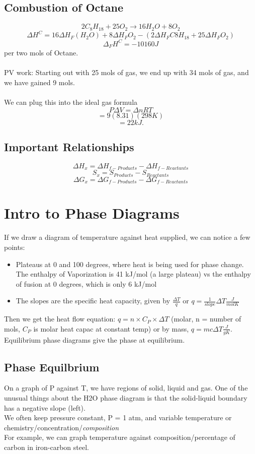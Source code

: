 \documentclass[10pt, twocolumn]{report}
\begin{document}
     \subsection{Combustion of Octane}
     $$2C_8H_{18} + 25O_2 \rightarrow 16H_2O + 8 O_2$$
     $$\Delta H^C = 16 \Delta H_F (H_2O) + 8 \Delta H_F O_2 - (2\Delta H_F C8H_{18} + 25\Delta H_F O_2)$$
     $$\Delta_F H^C = -10160 J $$ per two mols of Octane.\\\\ PV work: Starting out with 25 mols of gas, we end up with 34 mols of gas, and we have gained 9 mols. \\\\ We can plug this into the ideal gas formula $$P\Delta V = \Delta n R T$$ $$ = 9 (8.31)(298K)$$ $$=22 kJ. $$
     \subsection{Important Relationships}
	$$\Delta H_x = \Delta H_{f-Products} - \Delta H_{f-Reactants}$$
	$$ S_x = S_{Products} - S_{Reactants}$$
	$$\Delta G_x = \Delta G_{f - Products} - \Delta G_{f - Reactants}$$
    \section{Intro to Phase Diagrams}
    If we draw a diagram of temperature against heat supplied, we can notice a few points:
    \begin{itemize}
        \item Plateaus at 0 and 100 degrees, where heat is being used for phase change. The enthalpy of Vaporization is 41 kJ/mol (a large plateau) vs the enthalpy of fusion at 0 degrees, which is only 6 kJ/mol
        \item The slopes are the specific heat capacity, given by $\frac{\Delta T}{q}$ or $q = \frac{1}{slope}\Delta T \frac{J}{mol K}$
    \end{itemize}
    Then we get the heat flow equation: $q = n\times C_P\times \Delta T$ (molar, n = number of mols, $C_P$ is molar heat capac at constant temp) or by mass, $q = mc\Delta T \frac{J}{gK}$.\\ Equilibrium phase diagrams give the phase at equilibrium.
    \subsection{Phase Equilbrium}
    On a graph of P against T, we have regions of solid, liquid and gas. One of the unusual things about the H2O phase diagram is that the solid-liquid boundary has a negative slope (left). \\ We often keep pressure constant, P = 1 atm, and variable temperature or chemistry/concentration/\textit{composition} \\ For example, we can graph temperature against composition/percentage of carbon in iron-carbon steel.
\end{document}
